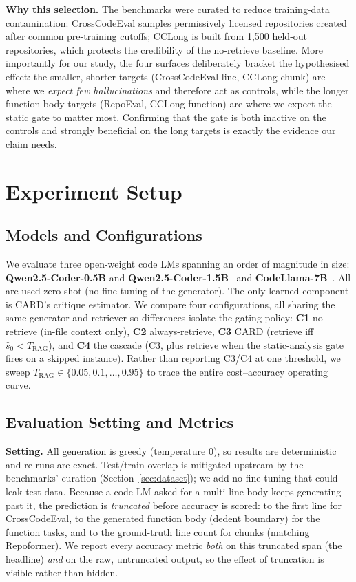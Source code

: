 \documentclass[10pt,conference]{IEEEtran}
\begin{document}
\textbf{Why this selection.} The benchmarks were curated to
reduce training-data contamination: CrossCodeEval samples permissively licensed
repositories created after common pre-training cutoffs; CCLong is built from 1{,}500
held-out repositories, which protects the credibility of the no-retrieve
baseline. More importantly for our study, the four surfaces deliberately bracket
the hypothesised effect: the smaller, shorter targets (CrossCodeEval line,
CCLong chunk) are where we \emph{expect few hallucinations} and therefore act as
controls, while the longer function-body targets (RepoEval, CCLong function) are
where we expect the static gate to matter most. Confirming that the gate is both
inactive on the controls and strongly beneficial on the long targets is exactly
the evidence our claim needs.

\section{Experiment Setup}

\subsection{Models and Configurations}
We evaluate three open-weight code LMs spanning an order of magnitude in size:
\textbf{Qwen2.5-Coder-0.5B} and \textbf{Qwen2.5-Coder-1.5B}~\cite{hui2024qwen25coder}
and \textbf{CodeLlama-7B}~\cite{roziere2023codellama}. All are used zero-shot
(no fine-tuning of the generator). The only learned component is CARD's
critique estimator. We compare four configurations, all sharing the same
generator and retriever so differences isolate the gating policy: \textbf{C1}
no-retrieve (in-file context only), \textbf{C2} always-retrieve,
\textbf{C3} CARD (retrieve iff $\hat{s}_0 < T_{\text{RAG}}$), and \textbf{C4}
the cascade (C3, plus retrieve when the static-analysis gate fires on a skipped
instance). Rather than reporting C3/C4 at one threshold, we sweep
$T_{\text{RAG}}\in\{0.05,0.1, \dots,0.95\}$ to trace the entire cost--accuracy
operating curve.

\subsection{Evaluation Setting and Metrics}
\label{sec:metrics}
\textbf{Setting.} All generation is greedy (temperature $0$), so results are
deterministic and re-runs are exact. Test/train overlap is mitigated upstream by
the benchmarks' curation (Section~\ref{sec:dataset}); we add no fine-tuning that
could leak test data. Because a code LM asked for a multi-line body keeps
generating past it, the prediction is \emph{truncated} before accuracy is scored:
to the first line for CrossCodeEval, to the generated function body (dedent
boundary) for the function tasks, and to the ground-truth line count for chunks
(matching Repoformer). We report every accuracy metric \emph{both} on this
truncated span (the headline) \emph{and} on the raw, untruncated output, so the
effect of truncation is visible rather than hidden.
\end{document}
